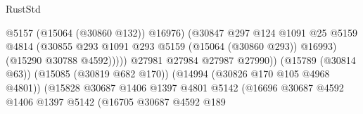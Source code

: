 \begin{lexlean}{RustStd}
\begin{coremodule}
                                                            @5157
                                                            (@15064 (@30860 @132))
                                                            @16976)
                                                          (@30847
                                                            @297
                                                            @124
                                                            @1091
                                                            @25
                                                            @5159
                                                            @4814
                                                            (@30855
                                                              @293
                                                              @1091
                                                              @293
                                                              @5159
                                                              (@15064 (@30860 @293))
                                                              @16993)
                                                            (@15290 @30788 @4592)))))
                                                    @27981
                                                    @27984
                                                    @27987
                                                    @27990))
                                                (@15789 (@30814 @63))
                                                (@15085 (@30819 @682 @170))
                                                (@14994 (@30826 @170 @105 @4968 @4801))
                                                (@15828
                                                  @30687
                                                  @1406
                                                  @1397
                                                  @4801
                                                  @5142
                                                  (@16696
                                                    @30687
                                                    @4592
                                                    @1406
                                                    @1397
                                                    @5142
                                                    (@16705
                                                      @30687
                                                      @4592
                                                      @189

\end{coremodule}
\end{lexlean}
